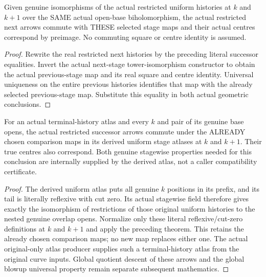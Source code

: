 \begin{theorem}
\label{hir:sharp-actual-curve-uniform-successor-restricted-compatible}
\leanok
Given genuine isomorphisms of the actual restricted uniform histories at
$k$ and $k+1$ over the SAME actual open-base biholomorphism, the actual
restricted next arrows commute with THESE selected stage maps and their
actual centres correspond by preimage. No commuting square or centre
identity is assumed.
\end{theorem}
\begin{proof}
Rewrite the real restricted next histories by the preceding literal
successor equalities. Invert the actual next-stage tower-isomorphism
constructor to obtain the actual previous-stage map and its real square
and centre identity. Universal uniqueness on the entire previous histories
identifies that map with the already selected previous-stage map. Substitute
this equality in both actual geometric conclusions.
\end{proof}

\begin{theorem}
\label{hir:sharp-actual-curve-uniform-stage-successor-compatible}
\leanok
For an actual terminal-history atlas and every $k$ and pair of its genuine
base opens, the actual restricted successor arrows commute under the
ALREADY chosen comparison maps in its derived uniform stage atlases at
$k$ and $k+1$. Their true centres also correspond. Both genuine stagewise
properties needed for this conclusion are internally supplied by the
derived atlas, not a caller compatibility certificate.
\end{theorem}
\begin{proof}
The derived uniform atlas puts all genuine $k$ positions in its prefix,
and its tail is literally reflexive with cut zero. Its actual stagewise
field therefore gives exactly the isomorphism of restrictions of those
original uniform histories to the nested genuine overlap opens. Normalize
only these literal reflexive/cut-zero definitions at $k$ and $k+1$ and
apply the preceding theorem. This retains the already chosen comparison
maps; no new map replaces either one. The actual original-only atlas
producer supplies such a terminal-history atlas from the original curve
inputs. Global quotient descent of these arrows and the global blowup
universal property remain separate subsequent mathematics.
\end{proof}

